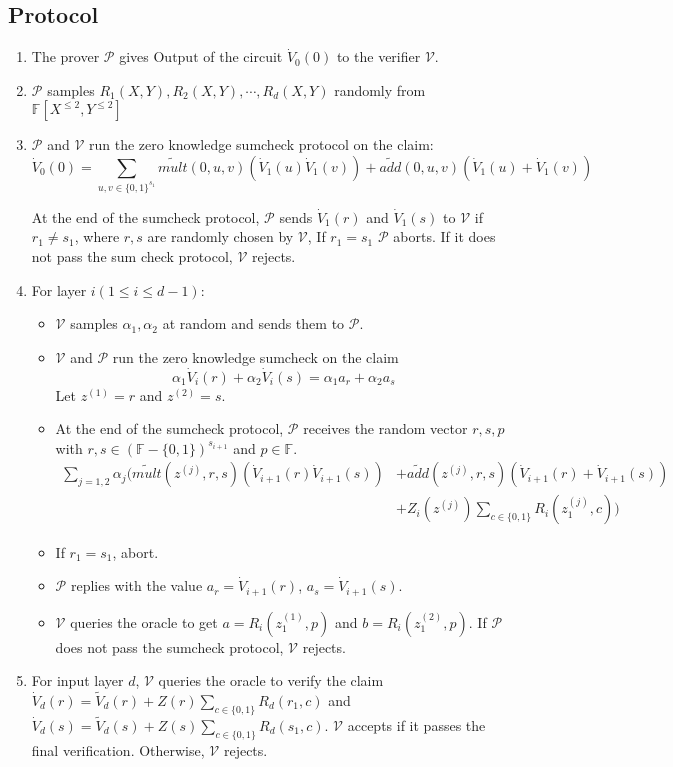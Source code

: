 \subsection{Protocol}
\begin{enumerate} 
\item The prover $\mathcal{P}$ gives $\text{Output}$ of the circuit $\dot{V}_0(0)$ to the verifier $\mathcal{V}$. 
\item $\mathcal{P}$ samples $R_1(X, Y), R_2(X, Y), \cdots, R_d(X, Y)$ randomly from $\mathbb{F}[X^{\leqslant 2}, Y^{\leqslant 2}]$
\item $\mathcal{P}$ and $\mathcal{V}$ run the zero knowledge sumcheck protocol on the claim:
$$\dot{V}_0(0) = \sum_{u, v\in \{0,1\}^{s_1}}\tilde{mult}(0, u, v)(\dot{V}_1(u)\dot{V}_1(v))+\tilde{add}(0,u,v)(\dot{V}_1(u)+\dot{V}_1(v))$$

At the end of the sumcheck protocol, $\mathcal{P}$ sends $\dot{V}_1(r)$ and $\dot{V}_1(s)$ to $\mathcal{V}$ if $r_1 \neq s_1$, where $r, s$ are randomly chosen by $\mathcal{V}$, If $r_1 = s_1$ $\mathcal{P}$ aborts. If it does not pass the sum check protocol, $\mathcal{V}$ rejects. 

\item For layer $i(1 \leq i \leq d - 1)$:
	\begin{itemize}
	\item $\mathcal{V}$ samples $\alpha_1, \alpha_2$ at random and sends them to $\mathcal{P}$.
	\item $\mathcal{V}$ and $\mathcal{P}$ run the zero knowledge sumcheck on the claim
	$$\alpha_1 \dot{V}_i(r) + \alpha_2 \dot{V}_i(s) = \alpha_1 a_{r} + \alpha_2 a_{s}$$
	Let $z^{(1)} = r$ and $z^{(2)} = s$.
	\item At the end of the sumcheck protocol, $\mathcal{P}$ receives the random vector $r, s, p$ with $r, s \in (\mathbb{F} - \{0, 1\})^{s_{i+1}}$ and $p \in \mathbb{F}$. 
	\begin{align*}
		\sum_{j = 1, 2} \alpha_j (\tilde{mult}(z^{(j)}, r, s)(\dot{V}_{i+1}(r)\dot{V}_{i+1}(s))&+\tilde{add}(z^{(j)},r,s)(\dot{V}_{i+1}(r)+\dot{V}_{i+1}(s))\\
 		&+ Z_i(z^{(j)})\sum\limits_{c \in \{0, 1\}}R_i(z^{(j)}_1, c))
	\end{align*}
	\item If $r_1 = s_1$, abort. 
	\item $\mathcal{P}$ replies with the value $a_r = \dot{V}_{i+1}(r)$, $a_s = \dot{V}_{i+1}(s)$.
	\item $\mathcal{V}$ queries the oracle to get $a = R_i(z^{(1)}_1, p)$ and $b = R_i(z^{(2)}_1, p)$. If $\mathcal{P}$ does not pass the sumcheck protocol, $\mathcal{V}$ rejects.
	\end{itemize}

\item For input layer $d$, $\mathcal{V}$ queries the oracle to verify the claim $\dot{V}_d(r) = \tilde{V}_d(r) + Z(r)\sum\limits_{c \in \{0, 1\}}R_d(r_1, c)$ and $\dot{V}_d(s) = \tilde{V}_d(s) + Z(s)\sum\limits_{c \in \{0, 1\}}R_d(s_1, c)$. $\mathcal{V}$ accepts if it passes the final verification. Otherwise, $\mathcal{V}$ rejects. 
\end{enumerate}

